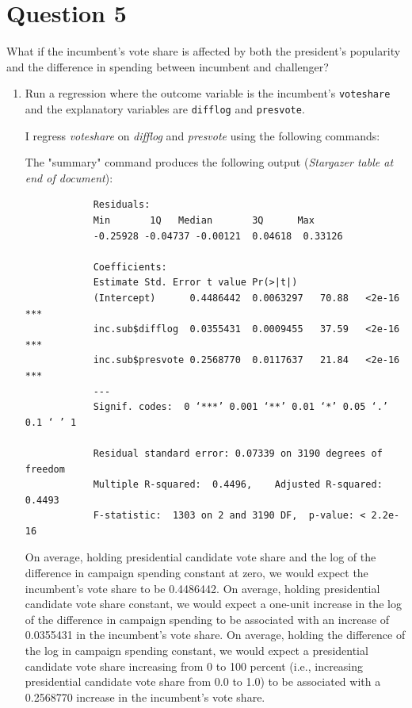 \documentclass[12pt,letterpaper]{article}
\begin{document}
	\newpage	

\section*{Question 5}
\noindent What if the incumbent's vote share is affected by both the president's popularity and the difference in spending between incumbent and challenger? 
	\begin{enumerate}
		\item Run a regression where the outcome variable is the incumbent's \texttt{voteshare} and the explanatory variables are \texttt{difflog} and \texttt{presvote}.	\vspace{.5cm}
		
		I regress \textit{voteshare} on \textit{difflog} and \textit{presvote} using the following commands:
		
		
		The "summary" command produces the following output (\textit{Stargazer table at end of document}):
		
			\begin{verbatim}
			Residuals:
			Min       1Q   Median       3Q      Max 
			-0.25928 -0.04737 -0.00121  0.04618  0.33126 
			
			Coefficients:
			Estimate Std. Error t value Pr(>|t|)    
			(Intercept)      0.4486442  0.0063297   70.88   <2e-16 ***
			inc.sub$difflog  0.0355431  0.0009455   37.59   <2e-16 ***
			inc.sub$presvote 0.2568770  0.0117637   21.84   <2e-16 ***
			---
			Signif. codes:  0 ‘***’ 0.001 ‘**’ 0.01 ‘*’ 0.05 ‘.’ 0.1 ‘ ’ 1
			
			Residual standard error: 0.07339 on 3190 degrees of freedom
			Multiple R-squared:  0.4496,	Adjusted R-squared:  0.4493 
			F-statistic:  1303 on 2 and 3190 DF,  p-value: < 2.2e-16
		\end{verbatim}
		
			On average, holding presidential candidate vote share and the log of the difference in campaign spending constant at zero, we would expect the incumbent's vote share to be 0.4486442. On average, holding presidential candidate vote share constant, we would expect a one-unit increase in the log of the difference in campaign spending to be associated with an increase of 0.0355431 in the incumbent's vote share. On average, holding the difference of the log in campaign spending constant, we would expect a presidential candidate vote share increasing from 0 to 100 percent  (i.e., increasing presidential candidate vote share from 0.0 to 1.0) to be associated with a 0.2568770 increase in the incumbent's vote share.
			

\end{enumerate}
\end{document}
